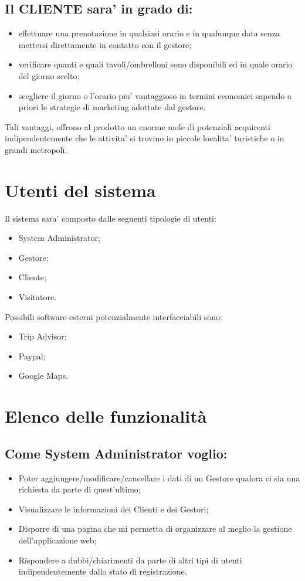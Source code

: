 \documentclass[a4paper]{article}
\begin{document}
\subsection{Il CLIENTE sara’ in grado di:}
\begin{itemize}
\item effettuare una prenotazione in qualsiasi orario e in qualunque data senza mettersi direttamente in contatto con il gestore;
\item verificare quanti e quali tavoli/ombrelloni sono disponibili ed in quale orario del giorno scelto;
\item scegliere il giorno o l’orario piu’ vantaggioso in termini economici sapendo a priori le strategie di marketing adottate dal gestore.
\end{itemize}

Tali vantaggi, offrono al prodotto un enorme mole di potenziali acquirenti indipendentemente che le attivita’ si trovino in piccole localita’ turistiche o in grandi metropoli.

\section{Utenti del sistema}
Il sistema sara’ composto dalle seguenti tipologie di utenti:
\begin{itemize}
\item System Administrator;
\item Gestore;
\item Cliente;
\item Visitatore.
\end{itemize}
Possibili software esterni potenzialmente interfacciabili sono:

\begin{itemize}
\item Trip Advisor;
\item Paypal;
\item Google Maps.
\end{itemize}



\section{Elenco delle funzionalità}

\subsection{Come System Administrator voglio:}
\begin{itemize}
\item Poter aggiungere/modificare/cancellare i dati di un Gestore qualora ci sia una richiesta da parte di quest'ultimo;
\item Visualizzare le informazioni dei Clienti e dei Gestori;
\item Disporre di una pagina che mi permetta di organizzare al meglio la gestione dell'applicazione web;
\item Rispondere a dubbi/chiarimenti da parte di altri tipi di utenti indipendentemente dallo stato di registrazione.
\end{itemize}
\end{document}

